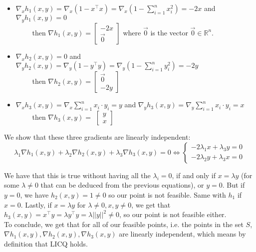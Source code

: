 \documentclass{article}
\newcommand{\R}{\mathbb{R}}
\newcommand{\tp}{^\top}
\begin{document}
\begin{itemize}
\item  $\nabla_x h_1(x,y)=\nabla_x \left(1-x\tp x\right)= \nabla_x \left(1-\sum_{i=1}^n x_{i}^2 \right)=-2x$  and $\nabla_y h_1(x,y)=0$ \\

$\qquad$ then $\nabla h_1(x,y)=
\begin{bmatrix}
-2 x\\
\vec{0}
\end{bmatrix}
$ where $\vec{0}$ is the vector $\vec{0} \in \R^n$.
\item  $\nabla_x h_2(x,y)=0$ and $\nabla_y h_2(x,y)=\nabla_y \left(1-y\tp y\right)= \nabla_y \left(1-\sum_{i=1}^n y_{i}^2 \right)=-2 y$ \\

$\qquad$ then $\nabla h_2(x,y)=
\begin{bmatrix}
\vec{0}\\
-2y
\end{bmatrix}
$
\item $\nabla_x h_3(x,y)= \nabla_x \sum_{i=1}^n x_i \cdot y_i=y$ and  $\nabla_y h_3(x,y)= \nabla_y \sum_{i=1}^n x_i \cdot y_i= x$\\

$\qquad$ then $\nabla h_3(x,y)=$
$
\begin{bmatrix}
y\\
x
\end{bmatrix}
$
\end{itemize} 

\noindent We show that these three gradients are linearly independent:\\
$$\lambda_1 \nabla h_1(x,y)+\lambda_2\nabla h_2(x,y)+\lambda_3 \nabla h_3(x,y)=0 \iff \begin{cases}- 2 \lambda_1 x + \lambda_3 y=0\\ -2 \lambda_2 y+  \lambda_3 x=0\end{cases}$$ 

We have that this is true without having all the $\lambda_i=0$, if and only if $x=\lambda y$ (for some $\lambda\neq 0$ that can be deduced from the previous equations), or $y=0$. But if $y=0$, we have $h_2(x,y)=1\neq 0$ so our point is not feasible. Same with $h_1$ if $x=0$. Lastly, if $x=\lambda y$ for $\lambda\neq 0, x, y \neq 0$, we get that $h_3(x,y)=x\tp y=\lambda y\tp y=\lambda ||y||^2 \neq 0$, so our point is not feasible either.\\
To conclude, we get that for all of our feasible points, i.e. the points in the set $S$, $ \nabla h_1(x,y), \nabla h_2(x,y), \nabla h_3(x,y)$ are linearly independent, which means by definition that LICQ holds.
\end{document}
